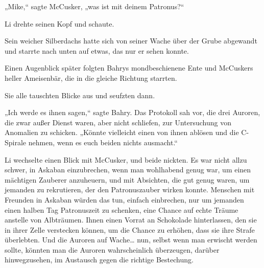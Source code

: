 „Mike,“ sagte McCusker, „was ist mit deinem Patronus?“

Li drehte seinen Kopf und schaute.

Sein weicher Silberdachs hatte sich von seiner Wache über der Grube abgewandt und starrte nach unten auf etwas, das nur er sehen konnte.

Einen Augenblick später folgten Bahrys mondbeschienene Ente und McCuskers heller Ameisenbär, die in die gleiche Richtung starrten.

Sie alle tauschten Blicke aus und seufzten dann.

„Ich werde es ihnen sagen,“ sagte Bahry. Das Protokoll sah vor, die drei Auroren, die zwar außer Dienst waren, aber nicht schliefen, zur Untersuchung von Anomalien zu schicken. „Könnte vielleicht einen von ihnen ablösen und die C-Spirale nehmen, wenn es euch beiden nichts ausmacht.“

Li wechselte einen Blick mit McCusker, und beide nickten. Es war nicht allzu schwer, in Askaban einzubrechen, wenn man wohlhabend genug war, um einen mächtigen Zauberer anzuheuern, und mit Absichten, die gut genug waren, um jemanden zu rekrutieren, der den Patronuszauber wirken konnte. Menschen mit Freunden in Askaban würden das tun, einfach einbrechen, nur um jemanden einen halben Tag Patronuszeit zu schenken, eine Chance auf echte Träume anstelle von Albträumen. Ihnen einen Vorrat an Schokolade hinterlassen, den sie in ihrer Zelle verstecken können, um die Chance zu erhöhen, dass sie ihre Strafe überlebten. Und die Auroren auf Wache… nun, selbst wenn man erwischt werden sollte, könnten man die Auroren wahrscheinlich überzeugen, darüber hinwegzusehen, im Austausch gegen die richtige Bestechung.

